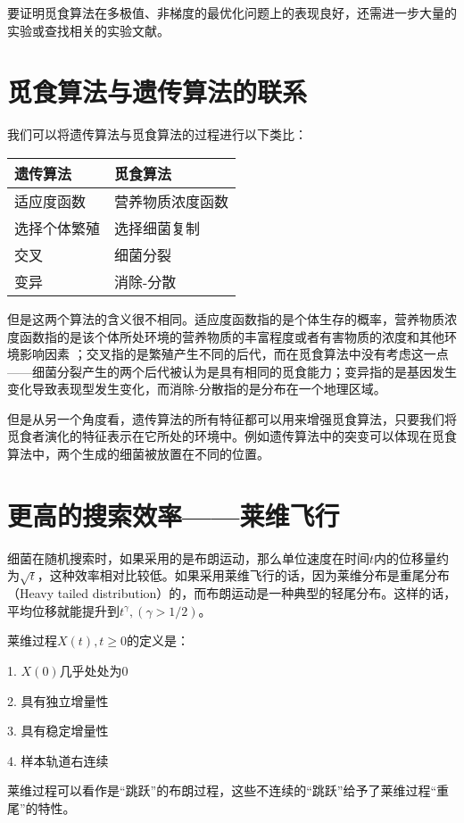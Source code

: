 \documentclass{article}
\begin{document}
要证明觅食算法在多极值、非梯度的最优化问题上的表现良好，还需进一步大量的实验或查找相关的实验文献。

\section{觅食算法与遗传算法的联系}
我们可以将遗传算法与觅食算法的过程进行以下类比：

\begin{center}
\begin{tabular}{|l|l|}
    \hline
\textbf{遗传算法} & \textbf{觅食算法} \\\hline
适应度函数 & 营养物质浓度函数 \\\hline
选择个体繁殖 & 选择细菌复制 \\\hline
交叉 & 细菌分裂 \\\hline
变异 & 消除-分散 \\\hline
\end{tabular}
\end{center}

但是这两个算法的含义很不相同。适应度函数指的是个体生存的概率，营养物质浓度函数指的是该个体所处环境的营养物质的丰富程度或者有害物质的浓度和其他环境影响因素
；交叉指的是繁殖产生不同的后代，而在觅食算法中没有考虑这一点——细菌分裂产生的两个后代被认为是具有相同的觅食能力；变异指的是基因发生变化导致表现型发生变化，而消除-分散指的是分布在一个地理区域。

但是从另一个角度看，遗传算法的所有特征都可以用来增强觅食算法，只要我们将觅食者演化的特征表示在它所处的环境中。例如遗传算法中的突变可以体现在觅食算法中，两个生成的细菌被放置在不同的位置。

\section{更高的搜索效率——莱维飞行}
细菌在随机搜索时，如果采用的是布朗运动，那么单位速度在时间$t$内的位移量约为$\sqrt{t}$，这种效率相对比较低。如果采用莱维飞行的话，因为莱维分布是重尾分布（Heavy tailed distribution）的，而布朗运动是一种典型的轻尾分布。这样的话，平均位移就能提升到$t^\gamma, (\gamma > 1/2)$。

莱维过程${X(t), t \geq 0}$的定义是：

1. $X(0)$几乎处处为0

2. 具有独立增量性

3. 具有稳定增量性

4. 样本轨道右连续

莱维过程可以看作是``跳跃''的布朗过程，这些不连续的``跳跃''给予了莱维过程``重尾''的特性。
\end{document}
